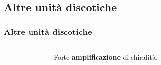 
\subsection{Altre unità discotiche}\begin{frame}\frametitle{Altre unità discotiche}
\begin{columns}
\begin{figure}{}\end{figure}
Forte \textbf{amplificazione} di chiralità.
\begin{columns}

\end{columns}
\end{columns}
\end{frame}
